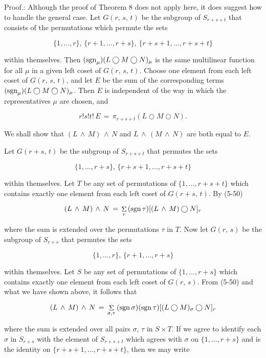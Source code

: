 Proof.: Although the proof of Theorem 8 does not apply here, it does suggest how to handle the general case. Let \(G(r,\,s,\,t)\) be the subgroup of \(S_{r+s+t}\) that consists of the permutations which permute the sets

\[\{1,\ldots,r\},\,\{r+1,\ldots,r+s\},\,\{r+s+1,\ldots,r+s+t\}\]

within themselves. Then \((\mathop{\rm sgn}\nolimits_{\mu})(L\bigcirc M\bigcirc N)_{\mu}\) is the same multilinear function for all \(\mu\) in a given left coset of \(G(r,\,s,\,t)\). Choose one element from each left coset of \(G(r,\,s,\,t)\), and let \(E\) be the sum of the corresponding terms \((\mathop{\rm sgn}\nolimits_{\mu})(L\bigcirc M\bigcirc N)_{\mu}\). Then \(E\) is independent of the way in which the representatives \(\mu\) are chosen, and

\[r!s!t!\,E\,=\,\pi_{r+s+t}(L\bigcirc M\bigcirc N).\]

We shall show that \((L\,\wedge\,M)\,\wedge\,N\) and \(L\,\wedge\,(M\,\wedge\,N)\) are both equal to \(E\).

Let \(G(r+s,\,t)\) be the subgroup of \(S_{r+s+t}\) that permutes the sets

\[\{1,\ldots,r+s\},\,\{r+s+1,\ldots,r+s+t\}\]

within themselves. Let \(T\) be any set of permutations of \(\{1,\ldots,r+s+t\}\) which contains exactly one element from each left coset of \(G(r+s,\,t)\). By (5-50)

\[(L\,\wedge\,M)\,\wedge\,N\,=\,\mathop{\Sigma}\limits_{r}\,(\mathop{\rm sgn} \nolimits\tau)[(L\,\wedge\,M)\bigcirc N]_{r}\]

where the sum is extended over the permutations \(\tau\) in \(T\). Now let \(G(r,\,s)\) be the subgroup of \(S_{r+s}\) that permutes the sets

\[\{1,\ldots,r\},\,\{r+1,\ldots,r+s\}\]

within themselves. Let \(S\) be any set of permutations of \(\{1,\ldots,r+s\}\) which contains exactly one element from each left coset of \(G(r,\,s)\). From (5-50) and what we have shown above, it follows that

\[(L\,\wedge\,M)\,\wedge\,N\,=\,\mathop{\Sigma}\limits_{\sigma,\tau}\,(\mathop{ \rm sgn}\nolimits\sigma)(\mathop{\rm sgn}\nolimits\tau)[(L\bigcirc M)_{\sigma }\bigcirc N]_{r}\]

where the sum is extended over all pairs \(\sigma\), \(\tau\) in \(S\times T\). If we agree to identify each \(\sigma\) in \(S_{r+s}\) with the element of \(S_{r+s+t}\) which agrees with \(\sigma\) on \(\{1,\ldots,r+s\}\) and is the identity on \(\{r+s+1,\ldots,r+s+t\}\), then we may write

